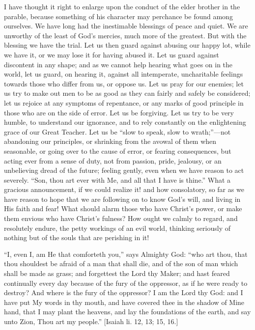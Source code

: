 I have thought it right to enlarge upon the conduct of the elder
brother in the parable, because something of his character may
perchance be found among ourselves. We have long had the inestimable
blessings of peace and quiet. We are unworthy of the least of God's
mercies, much more of the greatest. But with the blessing we have the
trial. Let us then guard against abusing our happy lot, while we have
it, or we may lose it for having abused it. Let us guard against
discontent in any shape; and as we cannot help hearing what goes on in
the world, let us guard, on hearing it, against all intemperate,
uncharitable feelings towards those who differ from us, or oppose us.
Let us pray for our enemies; let us try to make out men to be as good
as they can fairly and safely be considered; let us rejoice at any
symptoms of repentance, or any marks of good principle in those who
are on the side of error. Let us be forgiving. Let us try to be very
humble, to understand our ignorance, and to rely constantly on the
enlightening grace of our Great Teacher. Let us be ``slow to
speak, slow to wrath;''—not abandoning our principles, or
shrinking from the avowal of them when seasonable, or going over to
the cause of error, or fearing consequences, but acting ever from a
sense of duty, not from passion, pride, jealousy, or an unbelieving
dread of the future; feeling gently, even when we have reason to act
severely. ``Son, thou art ever with Me, and all that I have is
thine.'' What a gracious announcement, if we could realize it! and
how consolatory, so far as we have reason to hope that we are
following on to know God's will, and living in His faith and fear!
What should alarm those who have Christ's power, or make them envious
who have Christ's fulness? How ought we calmly to regard, and
resolutely endure, the petty workings of an evil world, thinking
seriously of nothing but of the souls that are perishing in it!

``I, even I, am He that comforteth you,'' says Almighty
God: ``who art thou, that thou shouldest be afraid of a man that
shall die, and of the son of man which shall be made as grass; and
forgettest the Lord thy Maker; and hast feared continually every day
because of the fury of the oppressor, as if he were ready to destroy?
And where is the fury of the oppressor? I am the Lord thy God: and I
have put My words in thy mouth, and have covered thee in the shadow of
Mine hand, that I may plant the heavens, and lay the foundations of
the earth, and say unto Zion, Thou art my people.'' [Isaiah li.
12, 13; 15, 16.]

